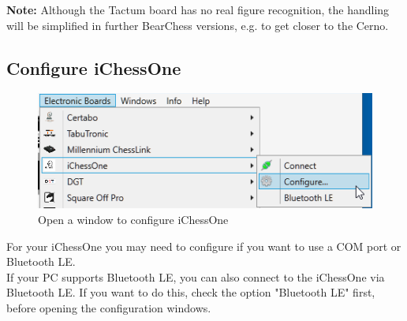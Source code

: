 \documentclass[11pt,a4paper]{article}
\begin{document}
{\color{red}\textbf{Note:}} Although the Tactum board has no real figure recognition, the handling will be simplified in further BearChess versions, e.g. to get closer to the Cerno.

\subsection{Configure iChessOne} \label{ConfigureIChessOne}
\begin{figure}[H]
	\centering
	\includegraphics[scale=1.0]{iChessOne1.png}
	\caption{Open a window to configure iChessOne }
	\label{fig:iChessOne1}
\end{figure}

For your iChessOne you may need to configure if you want to use a COM port or Bluetooth LE.\\
If your PC supports Bluetooth LE, you can also connect to the iChessOne via Bluetooth LE. If you want to do this, check the option "Bluetooth LE" first, before opening the configuration windows.\\
\end{document}

